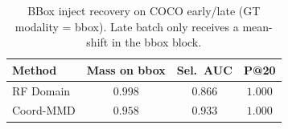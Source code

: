 \begin{table}[ht]
\centering
\caption{BBox inject recovery on COCO early/late (GT modality = bbox). Late batch only receives a mean-shift in the bbox block.}
\label{tab:bbox-attr-inject-recovery}
\small
\begin{tabular}{@{}l ccc@{}}
\toprule
Method & Mass on bbox & Sel.\ AUC & P@20 \\
\midrule
RF Domain & $0.998$ & $0.866$ & $1.000$ \\
Coord-MMD & $0.958$ & $0.933$ & $1.000$ \\
\bottomrule
\end{tabular}
\end{table}

